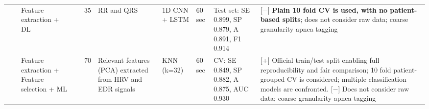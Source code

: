 \documentclass[5p,twocolumn,lefttitle]{elsarticle}
\begin{document}
\begin{table*}[!ht]
{\begin{tabularx}{2\textwidth}{@{}m{2.5em}p{7em}p{10em}lp{2em}p{12em}p{7em}p{3em}p{17em}X@{}}
                            &                                                         & Feature extraction + DL                                        & \cite{almutairi2020detection}            & 35            & RR and QRS                                                                                                        & 1D CNN + LSTM                       & 60 sec                                     & Test set: SE 0.899, SP 0.879, A 0.891, F1 0.914                                                                                                                                      & [$-$] \textbf{Plain 10 fold CV is used, with no patient-based splits}; does not consider raw data; coarse granularity apnea tagging                                                                                                                                                                                                                                                                                                                            \\
                            \cmidrule(l){3-10} 
                            &                                                         & Feature extraction + Feature selection + ML                    & \cite{sharma2020sleep}                   & 70            & Relevant features (PCA) extracted from HRV and EDR signals                                                         & KNN (k=32)                          & 60 sec                                     & CV: SE 0.849, SP 0.882, A 0.875, AUC 0.930                                                                                                                                               & [+] Official train/test split enabling full reproducibility and fair comparison; 10 fold patient-grouped CV is considered; multiple classification models are confronted. [$-$] Does not consider raw data; coarse granularity apnea tagging                                                                                                                                                                                                                                                                                           \\
                            \cmidrule(l){3-10} 

\end{tabularx}}
\end{table*}
\end{document}
